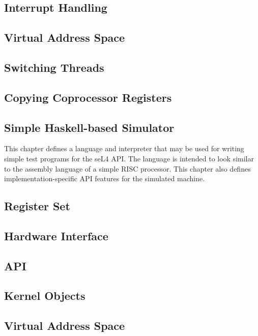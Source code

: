 \documentclass[a4paper,11pt,twoside]{report}
\begin{document}
\section{Interrupt Handling}


\section{Virtual Address Space}


\section{Switching Threads}


\section{Copying Coprocessor Registers}


\begin{impdetails}

\chapter{Simple Haskell-based Simulator}

This chapter defines a language and interpreter that may be used for writing simple test programs for the seL4 API. The language is intended to look similar to the assembly language of a simple RISC processor. This chapter also defines implementation-specific API features for the simulated machine.

\section{Register Set}


\section{Hardware Interface}


\section{API}


\section{Kernel Objects}


\section{Virtual Address Space}


\end{impdetails}



\end{document}
